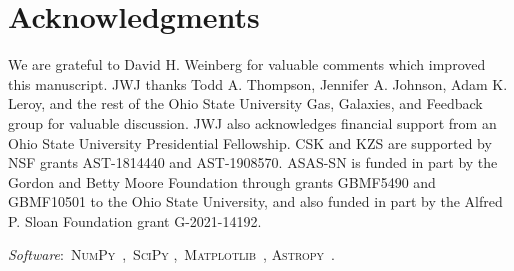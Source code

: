 \documentclass[foo.tex]{subfiles}
\begin{document}
\section{Acknowledgments}
\label{sec:acknowledgments}

We are grateful to David H. Weinberg for valuable comments which improved this
manuscript.
JWJ thanks Todd A. Thompson, Jennifer A. Johnson, Adam K. Leroy, and the rest
of the Ohio State University Gas, Galaxies, and Feedback group for valuable
discussion.
JWJ also acknowledges financial support from an Ohio State University
Presidential Fellowship.
CSK and KZS are supported by NSF grants AST-1814440 and AST-1908570.
ASAS-SN is funded in part by the Gordon and Betty Moore Foundation through
grants GBMF5490 and GBMF10501 to the Ohio State University, and also funded in
part by the Alfred P. Sloan Foundation grant G-2021-14192.
\par\null\par\noindent
\textit{Software}:~\textsc{NumPy}~\citep{Harris2020},~\textsc{SciPy}
\citep{Virtanen2020},~\textsc{Matplotlib}~\citep{Hunter2007},
\textsc{Astropy}~\citep{Astropy2013, Astropy2018, Astropy2022}.
\end{document}
